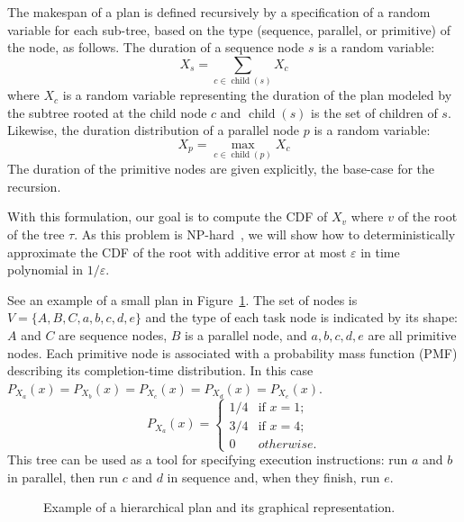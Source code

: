 \documentclass[review]{elsarticle}
\DeclareMathOperator{\ch}{\operatorname{child}}
\begin{document}
The makespan of a plan is defined recursively by a specification of a random variable for each sub-tree, based on the type (sequence, parallel, or primitive) of the node, as follows.
The duration of a sequence node $s$ is a random variable:
$$
X_s = \sum_{c\in \ch(s)} X_c
$$
where $X_c$ is a random variable representing the duration of the plan modeled by the subtree rooted at the child node $c$ and $\ch(s)$ is the set of children of $s$.
Likewise, the duration distribution of a parallel node $p$ is a random variable:
$$
X_p = \max_{c\in \ch(p)} X_c
$$
The duration of the primitive nodes are given explicitly, the base-case for the recursion.

With this formulation, our goal is to compute the CDF of $X_v$ where $v$ of the root of the tree $\tau$. 
As this problem is NP-hard~\cite{mohring2001scheduling}, we will show how to deterministically approximate the CDF of the root with additive error at most $\varepsilon$ in time polynomial in $1/\varepsilon$.

See an example of a small plan in Figure~\ref{fig:hierarchical plan}. The set of nodes is $V=\{ A,B,C,a,b,c,d,e \}$ and the type of each task node is indicated by its shape: $A$ and $C$ are sequence nodes, $ B $ is a parallel node, and $ a, b, c, d, e $ are all primitive nodes. Each primitive node is associated with a probability mass function (PMF) describing its completion-time distribution. In this case $P_{X_a}(x)=P_{X_b}(x)=P_{X_c}(x)=P_{X_d}(x)=P_{X_e}(x)$.
$$P_{X_a}(x)=
\begin{cases}
1/4 & \text{if } x=1; \\
3/4 & \text{if } x=4; \\
0 & otherwise.
\end{cases}$$
This tree can be used as a tool for specifying execution instructions: run $a$ and $b$ in parallel, then run $c$ and $d$ in sequence and, when they finish, run $e$.


\begin{figure}
	\centering
	\caption{Example of a hierarchical plan and its graphical representation.}
	\label{fig:hierarchical plan}
\end{figure}
\end{document}
